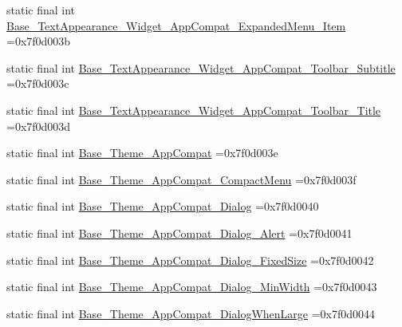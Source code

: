 \begin{DoxyCompactItemize}
\item 
static final int \mbox{\hyperlink{classcom_1_1example_1_1trainawearapplication_1_1_r_1_1style_a636ba8dc251cdb19404984153964b12c}{Base\+\_\+\+Text\+Appearance\+\_\+\+Widget\+\_\+\+App\+Compat\+\_\+\+Expanded\+Menu\+\_\+\+Item}} =0x7f0d003b
\item 
static final int \mbox{\hyperlink{classcom_1_1example_1_1trainawearapplication_1_1_r_1_1style_a1b9e61b675ff7b56a7edb301a5d94df7}{Base\+\_\+\+Text\+Appearance\+\_\+\+Widget\+\_\+\+App\+Compat\+\_\+\+Toolbar\+\_\+\+Subtitle}} =0x7f0d003c
\item 
static final int \mbox{\hyperlink{classcom_1_1example_1_1trainawearapplication_1_1_r_1_1style_a179ce5fff91e87a88a0bbcf6a7bc6d7e}{Base\+\_\+\+Text\+Appearance\+\_\+\+Widget\+\_\+\+App\+Compat\+\_\+\+Toolbar\+\_\+\+Title}} =0x7f0d003d
\item 
static final int \mbox{\hyperlink{classcom_1_1example_1_1trainawearapplication_1_1_r_1_1style_a7f32b561d263658bfd2899d8c25a6834}{Base\+\_\+\+Theme\+\_\+\+App\+Compat}} =0x7f0d003e
\item 
static final int \mbox{\hyperlink{classcom_1_1example_1_1trainawearapplication_1_1_r_1_1style_a3983a58c09a30b939becb1f2f71a81eb}{Base\+\_\+\+Theme\+\_\+\+App\+Compat\+\_\+\+Compact\+Menu}} =0x7f0d003f
\item 
static final int \mbox{\hyperlink{classcom_1_1example_1_1trainawearapplication_1_1_r_1_1style_a3a629b04beec4205091d27914db0eb42}{Base\+\_\+\+Theme\+\_\+\+App\+Compat\+\_\+\+Dialog}} =0x7f0d0040
\item 
static final int \mbox{\hyperlink{classcom_1_1example_1_1trainawearapplication_1_1_r_1_1style_ada03ce8f6fb06f5963d00b6d188dceb6}{Base\+\_\+\+Theme\+\_\+\+App\+Compat\+\_\+\+Dialog\+\_\+\+Alert}} =0x7f0d0041
\item 
static final int \mbox{\hyperlink{classcom_1_1example_1_1trainawearapplication_1_1_r_1_1style_a2886eecbaf1018d934e7c1209c171e9e}{Base\+\_\+\+Theme\+\_\+\+App\+Compat\+\_\+\+Dialog\+\_\+\+Fixed\+Size}} =0x7f0d0042
\item 
static final int \mbox{\hyperlink{classcom_1_1example_1_1trainawearapplication_1_1_r_1_1style_a147ce0f140302ab765c361dd9996543b}{Base\+\_\+\+Theme\+\_\+\+App\+Compat\+\_\+\+Dialog\+\_\+\+Min\+Width}} =0x7f0d0043
\item 
static final int \mbox{\hyperlink{classcom_1_1example_1_1trainawearapplication_1_1_r_1_1style_a2a891bb8417939bde5cd4ba0c9df8288}{Base\+\_\+\+Theme\+\_\+\+App\+Compat\+\_\+\+Dialog\+When\+Large}} =0x7f0d0044
\item 

\end{DoxyCompactItemize}

